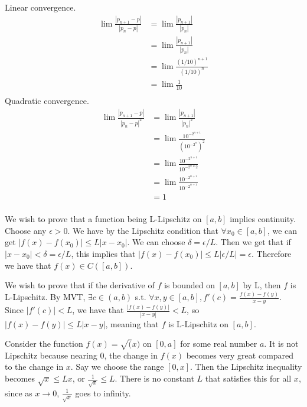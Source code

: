 \documentclass{homework}
\begin{document}
\question
Linear convergence.
\begin{align*}
    \lim \frac{|p_{n+1} - p|}{|p_n - p|}	&=	\lim \frac{|p_{n+1}|}{|p_n|}	\\
    &=	\lim \frac{|p_{n+1}|}{|p_n|}	\\
    &=	\lim \frac{(1/10)^{n+1}}{(1/10)^{n}}	\\
    &=	\lim \frac{1}{10}	\\
\end{align*}
Quadratic convergence.
\begin{align*}
    \lim \frac{|p_{n+1} - p|}{|p_n - p|^2}	&=	\lim \frac{|p_{n+1}|}{|p_n|^2}	\\
    &=	\lim \frac{10^{-2^{n+1}}}{(10^{-2^n})^2}	\\
    &=	\lim \frac{10^{-2^{n+1}}}{10^{-2^n*2}}	\\
    &=	\lim \frac{10^{-2^{n+1}}}{10^{-2^{n+1}}}	\\
    &=	1	\\
\end{align*}


\question
We wish to prove that a function being L-Lipschitz on $[a,b]$ implies continuity. Choose any $\epsilon > 0$. We have by the Lipschitz condition that $\forall x_0 \in [a,b]$, we can get $|f(x)-f(x_0)| \le L|x-x_0|$. We can choose $\delta = \epsilon/L$. Then we get that if $|x-x_0| < \delta = \epsilon/L$, this implies that $|f(x)-f(x_0)| \le L|\epsilon/L| = \epsilon$. Therefore we have that $f(x) \in C([a,b])$.

We wish to prove that if the derivative of $f$ is bounded on $[a,b]$ by L, then $f$ is L-Lipschitz. By MVT, $\exists c \in (a,b)$ s.t. $\forall x,y \in [a,b], f'(c) = \frac{f(x) - f(y)}{x-y}$. Since $|f'(c)| < L$, we have that $\frac{|f(x) - f(y)|}{|x-y|} < L$, so $|f(x) - f(y)| \le L|x-y|$, meaning that $f$ is L-Lipschitz on $[a,b]$.

Consider the function $f(x) = \sqrt(x)$ on $[0,a]$ for some real number $a$. It is not Lipschitz because nearing 0, the change in $f(x)$ becomes very great compared to the change in $x$. Say we choose the range $[0,x]$. Then the Lipschitz inequality becomes $\sqrt{x} \le Lx$, or $\frac{1}{\sqrt{x}} \le L$. There is no constant $L$ that satisfies this for all $x$, since as $x \to 0$, $\frac{1}{\sqrt{x}}$ goes to infinity.
\end{document}

